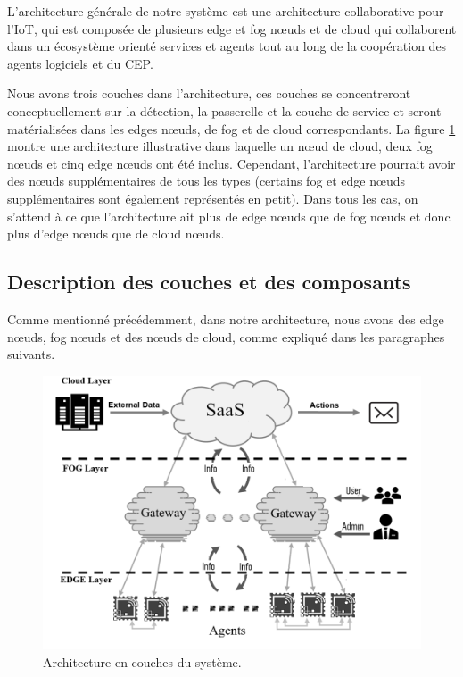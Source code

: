 L’architecture générale de notre système  est une architecture collaborative pour l'IoT, qui est composée de plusieurs edge et fog nœuds et de cloud qui collaborent dans un écosystème orienté services et agents tout au long de la coopération des agents logiciels et du CEP.


Nous avons trois couches dans l'architecture, ces couches se concentreront conceptuellement sur la détection, la passerelle et la couche de service et seront matérialisées dans les edges nœuds, de fog et de cloud correspondants. La figure  \ref{fc7}  montre une architecture illustrative dans laquelle un nœud de cloud, deux  fog nœuds et cinq edge nœuds ont été inclus. Cependant, l'architecture pourrait avoir des nœuds supplémentaires de tous les types (certains fog et edge nœuds supplémentaires sont également représentés en petit). Dans tous les cas, on s'attend à ce que l'architecture ait plus de edge nœuds  que de fog nœuds et donc plus d’edge nœuds que de cloud nœuds.
\subsection{Description des couches et des composants}

Comme mentionné précédemment, dans notre architecture, nous avons des edge nœuds, fog nœuds et des nœuds de cloud, comme expliqué dans les paragraphes suivants.

\begin{figure}[H]
\centering
\includegraphics[scale=0.5]{chap1/ARCH_G.png}
\caption{Architecture  en couches du système.}
\label{fc7}
\end{figure}

